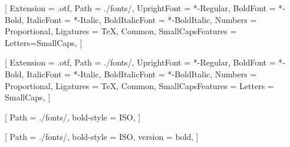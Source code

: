 
\setmainfont{LibertinusSerif}[%
Extension         = .otf,
Path              = ./fonts/,
UprightFont       = *-Regular,
BoldFont          = *-Bold,
ItalicFont        = *-Italic,
BoldItalicFont    = *-BoldItalic,
Numbers           = {Proportional},
Ligatures         = {TeX, Common},
SmallCapsFeatures = {Letters=SmallCaps},
]%

\setsansfont{LibertinusSans}[%
Extension         = .otf,
Path              = ./fonts/,
UprightFont       = *-Regular,
BoldFont          = *-Bold,
ItalicFont        = *-Italic,
BoldItalicFont    = *-BoldItalic,
Numbers           = {Proportional},
Ligatures         = {TeX, Common},
SmallCapsFeatures = {Letters = SmallCaps},
]%


\setmonofont{Latin Modern Mono}



[%
Path       = ./fonts/,
bold-style = ISO, %
]%

[%
Path       = ./fonts/,
bold-style = ISO, %
version    = bold,
]%


